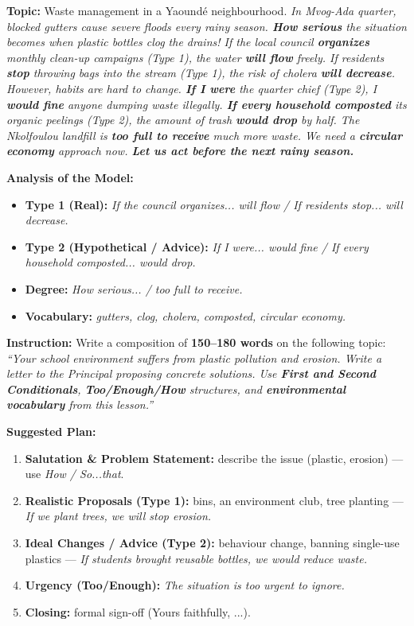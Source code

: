 \documentclass[11pt]{article}
\begin{document}
\begin{exoresolu}
\textbf{Topic:} Waste management in a Yaoundé neighbourhood.
\tcblower
\textit{In Mvog-Ada quarter, blocked gutters cause severe floods every rainy season. \textbf{How serious} the situation becomes when plastic bottles clog the drains! If the local council \textbf{organizes} monthly clean-up campaigns (Type 1), the water \textbf{will flow} freely. If residents \textbf{stop} throwing bags into the stream (Type 1), the risk of cholera \textbf{will decrease}. However, habits are hard to change. \textbf{If I were} the quarter chief (Type 2), I \textbf{would fine} anyone dumping waste illegally. \textbf{If every household composted} its organic peelings (Type 2), the amount of trash \textbf{would drop} by half. The Nkolfoulou landfill is \textbf{too full to receive} much more waste. We need a \textbf{circular economy} approach now. \textbf{Let us act before the next rainy season.}}

\textbf{Analysis of the Model:}
\begin{itemize}
    \item \textbf{Type 1 (Real):} \textit{If the council organizes... will flow / If residents stop... will decrease.}
    \item \textbf{Type 2 (Hypothetical / Advice):} \textit{If I were... would fine / If every household composted... would drop.}
    \item \textbf{Degree:} \textit{How serious... / too full to receive.}
    \item \textbf{Vocabulary:} \textit{gutters, clog, cholera, composted, circular economy.}
\end{itemize}
\end{exoresolu}

\begin{exercice}
\textbf{Instruction:} Write a composition of \textbf{150--180 words} on the following topic:
\textit{``Your school environment suffers from plastic pollution and erosion. Write a letter to the Principal proposing concrete solutions. Use \textbf{First and Second Conditionals}, \textbf{Too/Enough/How} structures, and \textbf{environmental vocabulary} from this lesson.''}

\textbf{Suggested Plan:}
\begin{enumerate}
    \item \textbf{Salutation \& Problem Statement:} describe the issue (plastic, erosion) --- use \emph{How / So...that}.
    \item \textbf{Realistic Proposals (Type 1):} bins, an environment club, tree planting --- \emph{If we plant trees, we will stop erosion.}
    \item \textbf{Ideal Changes / Advice (Type 2):} behaviour change, banning single-use plastics --- \emph{If students brought reusable bottles, we would reduce waste.}
    \item \textbf{Urgency (Too/Enough):} \emph{The situation is too urgent to ignore.}
    \item \textbf{Closing:} formal sign-off (Yours faithfully, ...).
\end{enumerate}
\end{exercice}
\end{document}
